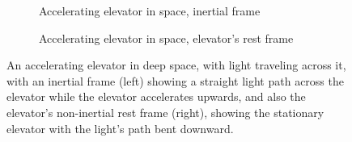 \begin{figure}[htbp]
    \centering
    \begin{subfigure}[b]{0.45\textwidth}
        \centering
        \caption{Accelerating elevator in space, inertial frame}
        \label{fig: light-straight}
    \end{subfigure}
    \hfill
    \begin{subfigure}[b]{0.45\textwidth}
        \centering
        \caption{Accelerating elevator in space, elevator's rest frame}
        \label{fig: light-curved}
    \end{subfigure}
    \caption{An accelerating elevator in deep space, with light traveling across it, with an inertial frame (left) showing a straight light path across the elevator while the elevator accelerates upwards, and also the elevator's non-inertial rest frame (right), showing the stationary elevator with the light's path bent downward.}
    \label{fig: light-frames}
\end{figure}

